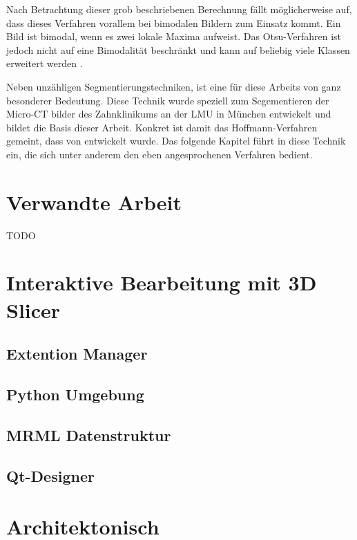 Nach Betrachtung dieser grob beschriebenen Berechnung fällt möglicherweise auf, dass
dieses Verfahren vorallem bei bimodalen Bildern zum Einsatz kommt. Ein Bild ist
bimodal, wenn es zwei lokale Maxima aufweist. Das Otsu-Verfahren ist jedoch nicht auf
eine Bimodalität beschränkt und kann auf beliebig viele Klassen erweitert werden
\citep[vgl.][Seite264]{lehmann2013bildverarbeitung}.

Neben unzähligen Segmentierungstechniken, ist eine für diese Arbeits von ganz besonderer
Bedeutung. Diese Technik wurde speziell zum Segementieren der Micro-CT bilder des
Zahnklinikums an der LMU in München entwickelt und bildet die Basis dieser Arbeit. Konkret
ist damit das Hoffmann-Verfahren gemeint, dass von \citet{hoffmann2020} entwickelt wurde.
Das folgende Kapitel führt in diese Technik ein, die sich unter anderem den eben
angesprochenen Verfahren bedient.

\section{Verwandte Arbeit}
\label{sec:verwwandte_arbeit}
TODO

\section{Interaktive Bearbeitung mit 3D Slicer}




\label{sec:3d_slicer}
\subsection{Extention Manager}
\subsection{Python Umgebung}
\subsection{MRML Datenstruktur}
\subsection{Qt-Designer}

\section{Architektonisch}
\label{sec:architektonisch}